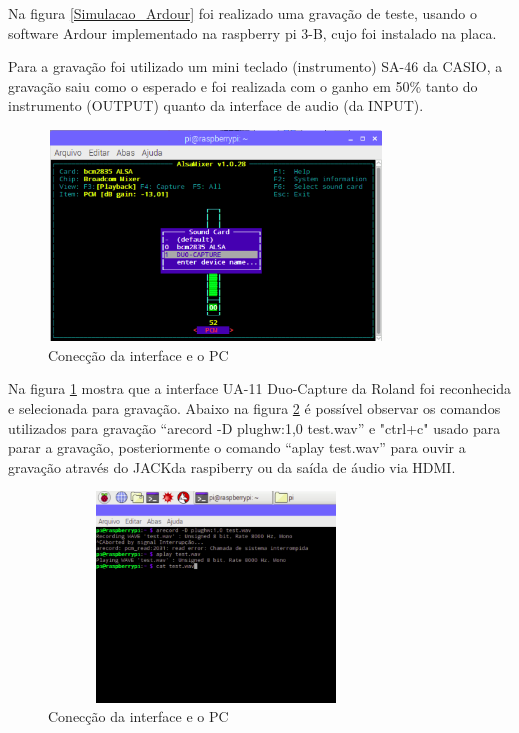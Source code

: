 \documentclass[conference]{IEEEtran}
\begin{document}
Na figura \ref{Simulacao_Ardour} foi realizado uma gravação de teste, usando o software Ardour implementado na raspberry pi 3-B, cujo foi instalado na placa.

Para a gravação foi utilizado um mini teclado (instrumento) SA-46 da CASIO, a gravação saiu como o esperado e foi realizada com o ganho em 50\% tanto do instrumento (OUTPUT) quanto da interface de audio (da INPUT).

\begin{figure}[!htb]
\centering
\includegraphics[width=3.5in, height=2.2in]{Imagens/Alsamixer}
\caption{Conecção da interface e o PC} 
\label{Alsamixer}
\end{figure}

Na figura \ref{Alsamixer} mostra que a interface UA-11 Duo-Capture da Roland foi reconhecida e selecionada para gravação. Abaixo na figura \ref{amixer} é possível observar os comandos utilizados para gravação “arecord -D plughw:1,0 test.wav” e "ctrl+c" usado para parar a gravação, posteriormente o comando “aplay test.wav” para ouvir a gravação através do JACKda raspiberry ou da saída de áudio via HDMI.
\begin{figure}[!htb]
\centering
\includegraphics[width=3.5in, height=2.2in]{Imagens/amixer}
\caption{Conecção da interface e o PC} 
\label{amixer}
\end{figure}






\end{document}
